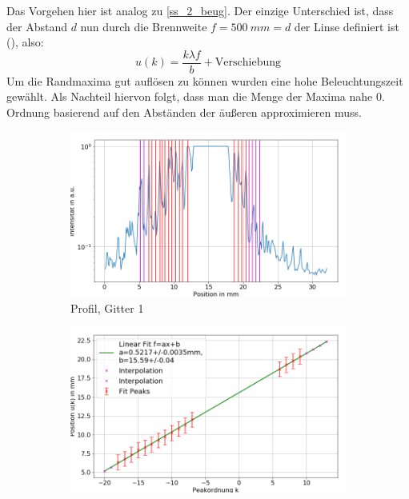 \documentclass[
	a4paper,
	12pt,
	pagesize,
	ngerman
]{scrartcl}
\begin{document}
	Das Vorgehen hier ist analog zu \cref{ss_2_beug}.
	Der einzige Unterschied ist, dass der Abstand $d$ nun durch die Brennweite $f=\SI{500}{mm}=d$ der Linse definiert ist (\cite{Anleitung2}), also:
 \begin{equation}
	 \label{eq_3_beug_verschieb}
	 u(k) = \frac{k\lambda f}{b} + \text{Verschiebung}
 \end{equation}
  Um die Randmaxima gut auflösen zu können wurden eine hohe Beleuchtungszeit gewählt.
	Als Nachteil hiervon folgt, dass man die Menge der Maxima nahe 0. Ordnung basierend auf den Abständen der äußeren approximieren muss.
 \begin{figure}[H]
        \centering
        \begin{subfigure}[b]{0.475\textwidth}
            \centering
            \includegraphics[width=\textwidth]{img/3/3_trafo_g1}
            \caption%
            {Profil, Gitter 1}
            \label{fig_3_profil_g1}
        \end{subfigure}
        \hfill
        \begin{subfigure}[b]{0.475\textwidth}
            \centering
            \includegraphics[width=\textwidth]{img/3/3_trafo_g1_fit}

\end{subfigure}
\end{figure}
\end{document}
